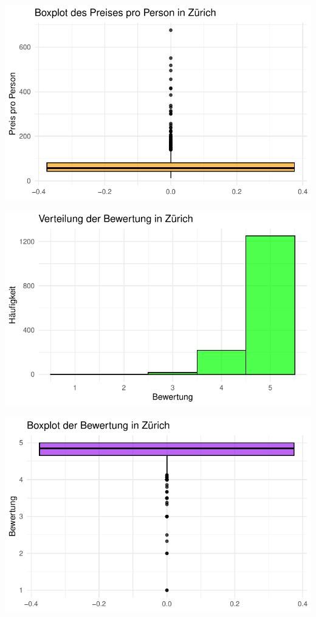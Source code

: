 \documentclass[
  journal,
]{IEEEtran}%
\begin{document}
\includegraphics{main_files/figure-pdf/descriptive zurich-2.pdf}

\includegraphics{main_files/figure-pdf/descriptive zurich-3.pdf}

\includegraphics{main_files/figure-pdf/descriptive zurich-4.pdf}
\end{document}
